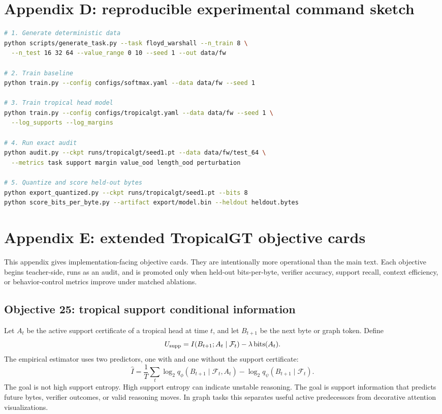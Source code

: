 \documentclass[11pt]{article}
\newcommand{\calF}{\mathcal{F}}
\begin{document}
\section{Appendix D: reproducible experimental command sketch}

\begin{lstlisting}[language=bash]
# 1. Generate deterministic data
python scripts/generate_task.py --task floyd_warshall --n_train 8 \
  --n_test 16 32 64 --value_range 0 10 --seed 1 --out data/fw

# 2. Train baseline
python train.py --config configs/softmax.yaml --data data/fw --seed 1

# 3. Train tropical head model
python train.py --config configs/tropicalgt.yaml --data data/fw --seed 1 \
  --log_supports --log_margins

# 4. Run exact audit
python audit.py --ckpt runs/tropicalgt/seed1.pt --data data/fw/test_64 \
  --metrics task support margin value_ood length_ood perturbation

# 5. Quantize and score held-out bytes
python export_quantized.py --ckpt runs/tropicalgt/seed1.pt --bits 8
python score_bits_per_byte.py --artifact export/model.bin --heldout heldout.bytes
\end{lstlisting}

\newpage

\newpage
\section{Appendix E: extended TropicalGT objective cards}

This appendix gives implementation-facing objective cards. They are intentionally more operational than the main text. Each objective begins teacher-side, runs as an audit, and is promoted only when held-out bits-per-byte, verifier accuracy, support recall, context efficiency, or behavior-control metrics improve under matched ablations.

\subsection{Objective 25: tropical support conditional information}
Let $A_t$ be the active support certificate of a tropical head at time $t$, and let $B_{t+1}$ be the next byte or graph token. Define
\begin{equation}
U_{\rm supp}=I(B_{t+1};A_t\mid \calF_t)-\lambda\operatorname{bits}(A_t).
\end{equation}
The empirical estimator uses two predictors, one with and one without the support certificate:
\begin{equation}
\widehat I=\frac1T\sum_t \log_2 q_\phi(B_{t+1}\mid \calF_t,A_t)-\log_2 q_\psi(B_{t+1}\mid \calF_t).
\end{equation}
The goal is not high support entropy. High support entropy can indicate unstable reasoning. The goal is support information that predicts future bytes, verifier outcomes, or valid reasoning moves. In graph tasks this separates useful active predecessors from decorative attention visualizations.
\end{document}
